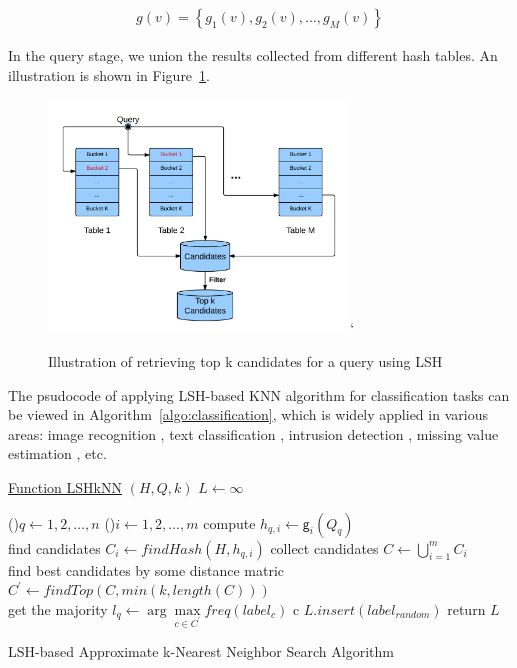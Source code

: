 \documentclass[letterpaper,twocolumn,10pt]{article}
\theoremstyle{definition}
\begin{document}
\begin{align*}
g(v) = \left\{g_1(v), g_2(v), ..., g_M(v)\right\}
\end{align*}

In the query stage, we union the results 
collected from different hash tables. An illustration is shown in Figure~\ref{figure:topk-illustration}.

\begin{figure}[t]
	\center
	\includegraphics[width=8cm]{graph.png}`
	\vspace{-0.5cm}
	\caption{Illustration of retrieving top k candidates for a query using LSH}
	\label{figure:topk-illustration}
	\vspace{0cm}

\end{figure}

The psudocode of applying LSH-based KNN algorithm
for classification tasks can be viewed in Algorithm~\ref{algo:classification}, which is widely applied in 
various areas: 
image recognition \cite{lee1991handwritten}, text classification \cite{tan2006effective}, intrusion 
detection \cite{liao2002use}, missing value estimation \cite{acuna2004treatment},  etc. 

\begin{algorithm}[h]
	\underline{Function LSHkNN} $(H, Q, k)$\;
	$L \leftarrow \infty$
	
	\For(){$q\leftarrow 1, 2, \ldots, n$ }{
		\For(){$i\leftarrow 1, 2, \ldots, m$}{        
			compute $h_{q, i} \leftarrow  \mathsf{g}_i(Q_q)$ \\
			find candidates $C_i \leftarrow findHash(H, h_{q, i})$
		}
		collect candidates $C \leftarrow \bigcup\limits_{i=1}^{m} C_{i}$ \\

		{
			find best candidates by some distance matric $C^{\prime} \leftarrow findTop(C, min(k, length(C)))$ \\
			get the majority $l_q \leftarrow \arg \max\limits_{c \in C^{\prime}} freq(label_c)$
			c
		}
		{
			$L.insert(label_{random})$
		}
	}
	return $L$\;
		
	\caption{LSH-based Approximate k-Nearest Neighbor Search Algorithm}
	\label{algo:classification}
\end{algorithm}
\end{document}
